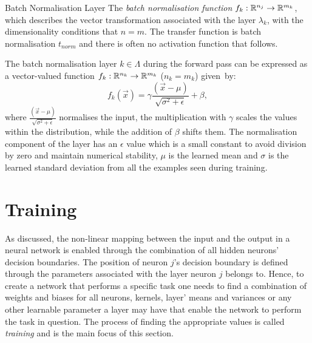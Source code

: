 \begin{Definition}{Batch Normalisation Layer}{}
The \emph{batch normalisation function} $f_k:\mathbb{R}^{n_j}\to \mathbb{R}^{m_k}$, which describes the vector transformation associated with the layer $\lambda_k$, with the dimensionality conditions that $n = m$. The transfer function is batch normalisation $t_{norm}$ and there is often no activation function that follows.
\end{Definition}


The batch normalisation layer $k\in \Lambda$ during the forward pass can be expressed as a vector-valued function $f_k:\mathbb{R}^{n_k}\to \mathbb{R}^{m_k}$ ($n_k=m_k$) given~by:
\begin{equation}
    f_k(\vec{x}) = \gamma \frac{(\vec{x}-\mu)}{\sqrt{\sigma^2 +\epsilon}} + \beta ,
\end{equation}
where $\frac{(\vec{x}-\mu)}{\sqrt{\sigma^2 +\epsilon}}$ normalises the input, the multiplication with $\gamma$ scales the values within the distribution, while the addition of $\beta$ shifts them. The normalisation component of the layer has an $\epsilon$ value which is a small constant to avoid division by zero and maintain numerical stability, $\mu$ is the learned mean and $\sigma$ is the learned standard deviation from all the examples seen during training.




\section{Training}
\label{sec:training}
As discussed, the non-linear mapping between the input and the output in a neural network is enabled through the combination of all hidden neurons’ decision boundaries. The position of neuron $j$'s decision boundary is defined through the parameters associated with the layer neuron $j$ belongs to. Hence, to create a network that performs a specific task one needs to find a combination of weights and biases for all neurons, kernels, layer' means and variances or any other learnable parameter a layer may have that enable the network to perform the task in question. The process of finding the appropriate values is called \emph{training} and is the main focus of this section. 

